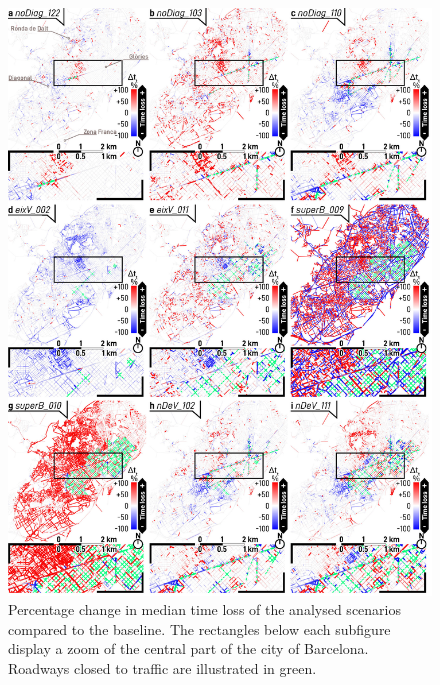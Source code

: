 \begin{figure}[htbp!]
    \centering
    \includegraphics[width=1\textwidth]{LCBM_fig_map_04.jpg}
    \captionsetup{font=scriptsize}
    \caption{Percentage change in median time loss of the analysed scenarios compared to the baseline. The rectangles below each subfigure display a zoom of the central part of the city of Barcelona. Roadways closed to traffic are illustrated in green.}
   \label{fig:LCBM_fig_map_04}
\end{figure}

